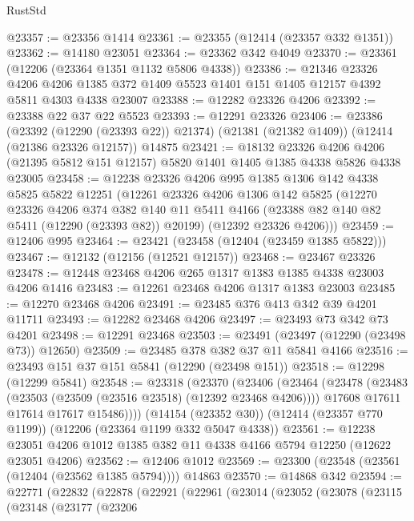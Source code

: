\begin{lexlean}{RustStd}
\begin{coremodule}
@23357 := @23356 @1414
@23361 := @23355 (@12414 (@23357 @332 @1351))
@23362 := @14180 @23051
@23364 := @23362 @342 @4049
@23370 := @23361 (@12206 (@23364 @1351 @1132 @5806 @4338))
@23386 := @21346
    @23326
    @4206
    @4206
    @1385
    @372
    @1409
    @5523
    @1401
    @151
    @1405
    @12157
    @4392
    @5811
    @4303
    @4338
    @23007
@23388 := @12282 @23326 @4206
@23392 := @23388 @22 @37 @22 @5523
@23393 := @12291 @23326
@23406 := @23386
    (@23392 (@12290 (@23393 @22)) @21374)
    (@21381 (@21382 @1409))
    (@12414 (@21386 @23326 @12157))
    @14875
@23421 := @18132
    @23326
    @4206
    @4206
    (@21395 @5812 @151 @12157)
    @5820
    @1401
    @1405
    @1385
    @4338
    @5826
    @4338
    @23005
@23458 := @12238
    @23326
    @4206
    @995
    @1385
    @1306
    @142
    @4338
    @5825
    @5822
    @12251
    (@12261
      @23326
      @4206
      @1306
      @142
      @5825
      (@12270
        @23326
        @4206
        @374
        @382
        @140
        @11
        @5411
        @4166
        (@23388 @82 @140 @82 @5411 (@12290 (@23393 @82)) @20199)
        (@12392 @23326 @4206)))
@23459 := @12406 @995
@23464 := @23421 (@23458 (@12404 (@23459 @1385 @5822)))
@23467 := @12132 (@12156 (@12521 @12157))
@23468 := @23467 @23326
@23478 := @12448 @23468 @4206 @265 @1317 @1383 @1385 @4338 @23003 @4206 @1416
@23483 := @12261 @23468 @4206 @1317 @1383 @23003
@23485 := @12270 @23468 @4206
@23491 := @23485 @376 @413 @342 @39 @4201 @11711
@23493 := @12282 @23468 @4206
@23497 := @23493 @73 @342 @73 @4201
@23498 := @12291 @23468
@23503 := @23491 (@23497 (@12290 (@23498 @73)) @12650)
@23509 := @23485 @378 @382 @37 @11 @5841 @4166
@23516 := @23493 @151 @37 @151 @5841 (@12290 (@23498 @151))
@23518 := @12298 (@12299 @5841)
@23548 := @23318
    (@23370
      (@23406
        (@23464
          (@23478
            (@23483 (@23503 (@23509 (@23516 @23518) (@12392 @23468 @4206))))
            @17608
            @17611
            @17614
            @17617
            @15486))))
    (@14154 (@23352 @30))
    (@12414 (@23357 @770 @1199))
    (@12206 (@23364 @1199 @332 @5047 @4338))
@23561 := @12238 @23051 @4206 @1012 @1385 @382 @11 @4338 @4166 @5794 @12250 (@12622 @23051 @4206)
@23562 := @12406 @1012
@23569 := @23300 (@23548 (@23561 (@12404 (@23562 @1385 @5794)))) @14863
@23570 := @14868 @342
@23594 := @22771
    (@22832
      (@22878
        (@22921
          (@22961
            (@23014
              (@23052
                (@23078
                  (@23115
                    (@23148
                      (@23177
                        (@23206

\end{coremodule}
\end{lexlean}
